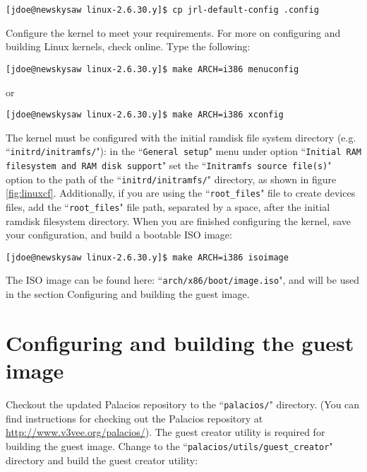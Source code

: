\documentclass{article}[11pt]
\begin{document}
\begin{verbatim}
[jdoe@newskysaw linux-2.6.30.y]$ cp jrl-default-config .config
\end{verbatim}

\noindent
Configure the kernel to meet your requirements. For more on configuring and
building Linux kernels, check online. Type the following:

\begin{verbatim}
[jdoe@newskysaw linux-2.6.30.y]$ make ARCH=i386 menuconfig
\end{verbatim}

\noindent
or

\begin{verbatim}
[jdoe@newskysaw linux-2.6.30.y]$ make ARCH=i386 xconfig
\end{verbatim}

\noindent
The kernel must be configured with the initial ramdisk file system directory
(e.g. ``\verb|initrd/initramfs/|"): in the ``\verb|General setup|" menu under
option
``\verb|Initial RAM filesystem and RAM disk support|" set the
``\verb|Initramfs source file(s)|" option to the path of the
``\verb|initrd/initramfs/|" directory, as shown in figure \ref{fig:linuxcf}.
Additionally, if you are using the ``\verb|root_files|" file to create devices
files, add the ``\verb|root_files|" file path, separated by a space, after the
initial ramdisk filesystem directory. When you are finished configuring the
kernel, save your configuration, and build a bootable ISO image:

\begin{verbatim}
[jdoe@newskysaw linux-2.6.30.y]$ make ARCH=i386 isoimage
\end{verbatim}

\noindent
The ISO image can be found here: ``\verb|arch/x86/boot/image.iso|", and will be
used in the section Configuring and building the guest image.


\section{Configuring and building the guest image}

Checkout the updated Palacios repository to the ``\verb|palacios/|" directory.
(You can find instructions for checking out the Palacios repository at
\url{http://www.v3vee.org/palacios/}). The guest creator utility is required for
building the guest image. Change to the ``\verb|palacios/utils/guest_creator|"
directory and build the guest creator utility:
\end{document}
